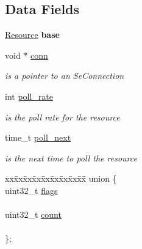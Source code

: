 \subsection*{Data Fields}
\begin{DoxyCompactItemize}
\item 
\mbox{\label{structStub_ab023791d92d9f03ab3e3193600f07ea4}} 
\hyperlink{structResource}{Resource} {\bfseries base}
\item 
\mbox{\label{structStub_a2450f7f3ff0f1b7ab45fbe127d56a562}} 
void $\ast$ \hyperlink{structStub_a2450f7f3ff0f1b7ab45fbe127d56a562}{conn}
\begin{DoxyCompactList}\small\item\em is a pointer to an Se\+Connection \end{DoxyCompactList}\item 
\mbox{\label{structStub_a016f6fa267a5c0477cbc5aa891067e85}} 
int \hyperlink{structStub_a016f6fa267a5c0477cbc5aa891067e85}{poll\+\_\+rate}
\begin{DoxyCompactList}\small\item\em is the poll rate for the resource \end{DoxyCompactList}\item 
\mbox{\label{structStub_aff83e689245e091df91c5557f4d6a2dd}} 
time\+\_\+t \hyperlink{structStub_aff83e689245e091df91c5557f4d6a2dd}{poll\+\_\+next}
\begin{DoxyCompactList}\small\item\em is the next time to poll the resource \end{DoxyCompactList}\item 
\mbox{\label{structStub_a4f7beac68bbc637c3ebaac85b991be8c}} 
\begin{tabbing}
xx\=xx\=xx\=xx\=xx\=xx\=xx\=xx\=xx\=\kill
union \{\\
\>uint32\_t \hyperlink{structStub_a0f1287218e96b9ff7d2fe3464f0c7421}{flags}\\
\>\\
\>uint32\_t \hyperlink{structStub_a3fe8a6d4ee70417e24becff7169ee75c}{count}\\
\>\\
\}; \\


\end{tabbing}
\end{DoxyCompactItemize}
